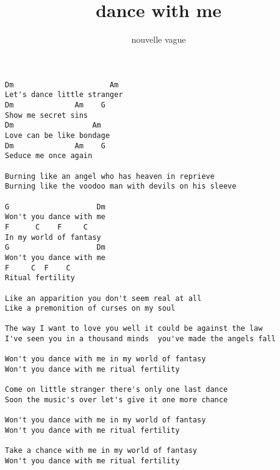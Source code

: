 \author{nouvelle vague}
\title{dance with me}
\maketitle
\begin{verbatim}
Dm                      Am 
Let's dance little stranger 
Dm              Am    G 
Show me secret sins 
Dm                  Am 
Love can be like bondage 
Dm              Am    G 
Seduce me once again 
 
Burning like an angel who has heaven in reprieve 
Burning like the voodoo man with devils on his sleeve 
 
G                    Dm 
Won't you dance with me 
F      C    F     C 
In my world of fantasy 
G                    Dm 
Won't you dance with me 
F     C  F    C 
Ritual fertility 
 
Like an apparition you don't seem real at all 
Like a premonition of curses on my soul 
 
The way I want to love you well it could be against the law 
I've seen you in a thousand minds  you've made the angels fall 
 
Won't you dance with me in my world of fantasy 
Won't you dance with me ritual fertility 
 
Come on little stranger there's only one last dance 
Soon the music's over let's give it one more chance 
 
Won't you dance with me in my world of fantasy 
Won't you dance with me ritual fertility 
 
Take a chance with me in my world of fantasy 
Won't you dance with me ritual fertility
\end{verbatim}